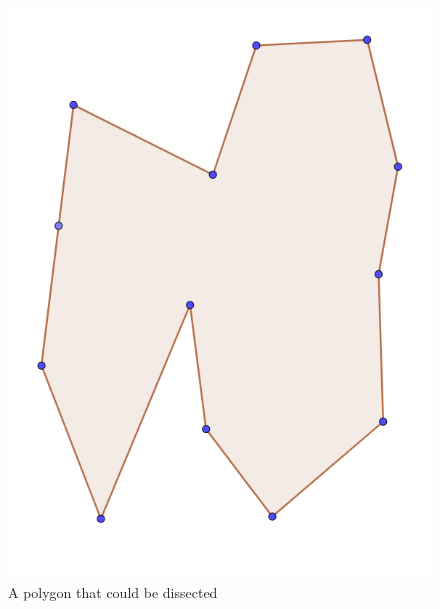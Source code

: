 \documentclass[12pt]{article}
\begin{document}
\begin{figure}[H]
  \includegraphics[width=\linewidth]{Images/intersection_polygon.png}
  \caption{A polygon that could be dissected}
  \label{fig:intersectionExamplePolygon}
\endminipage\hfill
{}

\end{figure}
\end{document}

